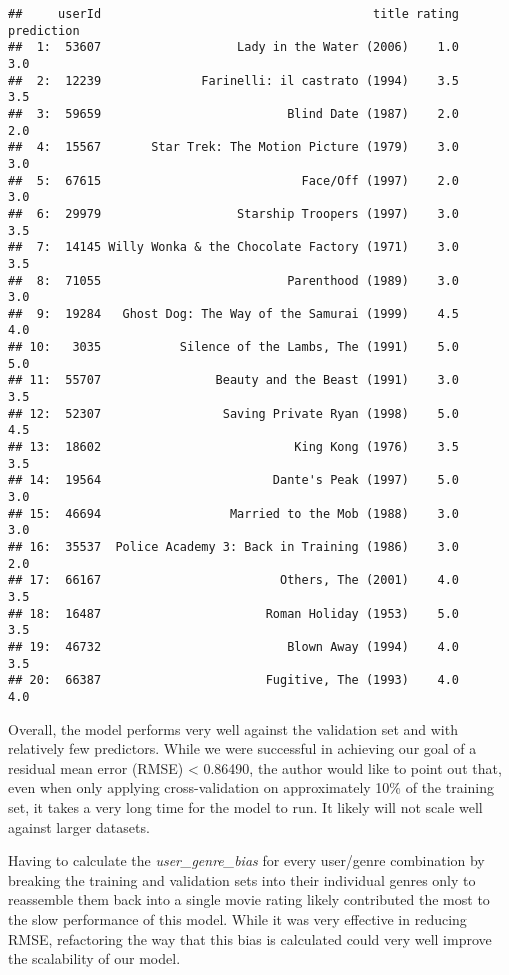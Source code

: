 \documentclass[
]{article}
\begin{document}
\begin{verbatim}
##     userId                                      title rating prediction
##  1:  53607                   Lady in the Water (2006)    1.0        3.0
##  2:  12239              Farinelli: il castrato (1994)    3.5        3.5
##  3:  59659                          Blind Date (1987)    2.0        2.0
##  4:  15567       Star Trek: The Motion Picture (1979)    3.0        3.0
##  5:  67615                            Face/Off (1997)    2.0        3.0
##  6:  29979                   Starship Troopers (1997)    3.0        3.5
##  7:  14145 Willy Wonka & the Chocolate Factory (1971)    3.0        3.5
##  8:  71055                          Parenthood (1989)    3.0        3.0
##  9:  19284   Ghost Dog: The Way of the Samurai (1999)    4.5        4.0
## 10:   3035           Silence of the Lambs, The (1991)    5.0        5.0
## 11:  55707                Beauty and the Beast (1991)    3.0        3.5
## 12:  52307                 Saving Private Ryan (1998)    5.0        4.5
## 13:  18602                           King Kong (1976)    3.5        3.5
## 14:  19564                        Dante's Peak (1997)    5.0        3.0
## 15:  46694                  Married to the Mob (1988)    3.0        3.0
## 16:  35537  Police Academy 3: Back in Training (1986)    3.0        2.0
## 17:  66167                         Others, The (2001)    4.0        3.5
## 18:  16487                       Roman Holiday (1953)    5.0        3.5
## 19:  46732                          Blown Away (1994)    4.0        3.5
## 20:  66387                       Fugitive, The (1993)    4.0        4.0
\end{verbatim}

Overall, the model performs very well against the validation set and
with relatively few predictors. While we were successful in achieving
our goal of a residual mean error (RMSE) \textless{} 0.86490, the author
would like to point out that, even when only applying cross-validation
on approximately 10\% of the training set, it takes a very long time for
the model to run. It likely will not scale well against larger datasets.

Having to calculate the \emph{user\_genre\_bias} for every user/genre
combination by breaking the training and validation sets into their
individual genres only to reassemble them back into a single movie
rating likely contributed the most to the slow performance of this
model. While it was very effective in reducing RMSE, refactoring the way
that this bias is calculated could very well improve the scalability of
our model.
\end{document}
